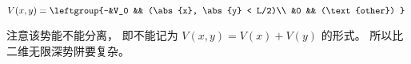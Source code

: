 
\begin{issues}
\issueDraft
\end{issues}

\begin{equation}
V(x,y) = \leftgroup{-&V_0 && (\abs{x}, \abs{y} < L/2)\\
&0 && (\text{other}) }~
\end{equation}

注意该势能不能分离， 即不能记为 $V(x,y) = V(x) + V(y)$ 的形式。 所以比二维无限深势阱要复杂。

